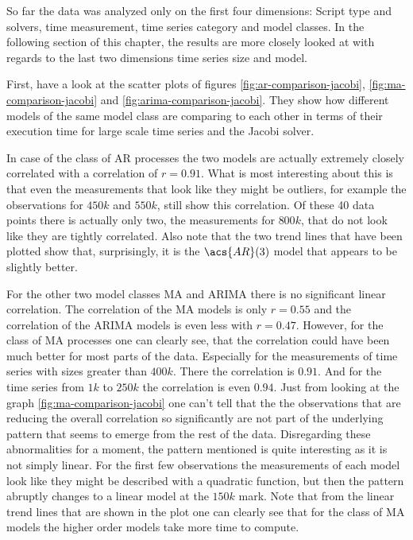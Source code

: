 So far the data was analyzed only on the first four dimensions: Script type and solvers, time measurement, time series category and model classes. In the following section of this chapter, the results are more closely looked at with regards to the last two dimensions time series size and model. 

First, have a look at the scatter plots of figures \ref{fig:ar-comparison-jacobi}, \ref{fig:ma-comparison-jacobi} and \ref{fig:arima-comparison-jacobi}. They show how different models of the same model class are comparing to each other in terms of their execution time for large scale time series and the Jacobi solver. 

In case of the class of \acl{AR} processes the two models are actually extremely closely correlated with a correlation of $r=0.91$. What is most interesting about this is that even the measurements that look like they might be outliers, for example the observations for $450k$ and $550k$, still show this correlation. Of these 40 data points there is actually only two, the measurements for $800k$, that do not look like they are tightly correlated. Also note that the two trend lines that have been plotted show that, surprisingly, it is the $\acs{AR}(3)$ model that appears to be slightly better.

For the other two model classes \acs{MA} and \acs{ARIMA} there is no significant linear correlation. The correlation of the \acl{MA} models is only $r=0.55$ and the correlation of the \acs{ARIMA} models is even less with $r=0.47$. However, for the class of \acs{MA} processes one can clearly see, that the correlation could have been much better for most parts of the data. Especially for the measurements of time series with sizes greater than $400k$. There the correlation is $0.91$. And for the time series from $1k$ to $250k$ the correlation is even $0.94$. Just from looking at the graph \ref{fig:ma-comparison-jacobi} one can't tell that the the observations that are reducing the overall correlation so significantly are not part of the underlying pattern that seems to emerge from the rest of the data. Disregarding these abnormalities for a moment, the pattern mentioned is quite interesting as it is not simply linear. For the first few observations the measurements of each model look like they might be described with a quadratic function, but then the pattern abruptly changes to a linear model at the $150k$ mark. Note that from the linear trend lines that are shown in the plot one can clearly see that for the class of \acl{MA} models the higher order models take more time to compute.

